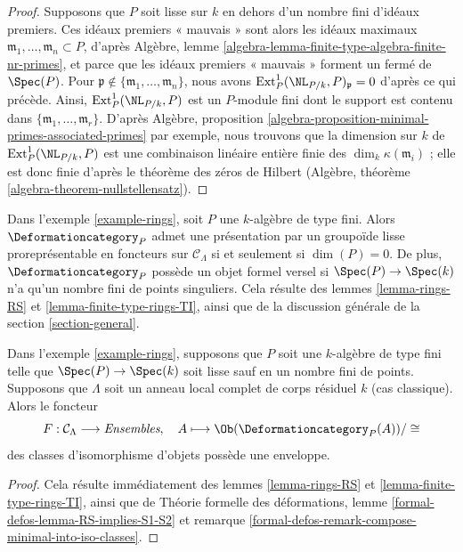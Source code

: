 \begin{proof}
\medskip\noindent
Supposons que $P$ soit lisse sur $k$ en dehors d'un nombre fini d'idéaux premiers.
Ces idéaux premiers « mauvais » sont alors les idéaux maximaux
$\mathfrak m_1, \ldots, \mathfrak m_n \subset P$, d'après
Algèbre, lemme \ref{algebra-lemma-finite-type-algebra-finite-nr-primes},
et parce que les idéaux premiers « mauvais » forment un fermé de $\Spec(P)$.
Pour $\mathfrak p \not \in \{\mathfrak m_1, \ldots, \mathfrak m_n\}$,
nous avons $\text{Ext}^1_P(\NL_{P/k}, P)_\mathfrak p = 0$ d'après ce qui précède.
Ainsi, $\text{Ext}^1_P(\NL_{P/k}, P)$ est un $P$-module fini
dont le support est contenu dans $\{\mathfrak m_1, \ldots, \mathfrak m_r\}$.
D'après Algèbre, proposition
\ref{algebra-proposition-minimal-primes-associated-primes}
par exemple, nous trouvons que la dimension sur $k$ de
$\text{Ext}^1_P(\NL_{P/k}, P)$ est une combinaison linéaire entière finie
des $\dim_k \kappa(\mathfrak m_i)$ ; elle est donc finie d'après
le théorème des zéros de Hilbert
(Algèbre, théorème \ref{algebra-theorem-nullstellensatz}).
\end{proof}

\noindent
Dans l'exemple \ref{example-rings}, soit $P$ une
$k$-algèbre de type fini. Alors $\Deformationcategory_P$
admet une présentation par un groupoïde lisse proreprésentable en foncteurs
sur $\mathcal{C}_\Lambda$ si et seulement si $\dim(P) = 0$.
De plus, $\Deformationcategory_P$ possède un objet
formel versel si $\Spec(P) \to \Spec(k)$ n'a qu'un nombre fini de
points singuliers. Cela résulte des lemmes \ref{lemma-rings-RS} et
\ref{lemma-finite-type-rings-TI},
ainsi que de la discussion générale de la section \ref{section-general}.

\begin{lemma}
\label{lemma-rings-hull}
Dans l'exemple \ref{example-rings}, supposons que $P$ soit une
$k$-algèbre de type fini telle que $\Spec(P) \to \Spec(k)$ soit lisse sauf
en un nombre fini de points.
Supposons que $\Lambda$ soit un anneau local complet de corps résiduel $k$
(cas classique). Alors le foncteur
$$
F : \mathcal{C}_\Lambda \longrightarrow \textit{Ensembles},\quad
A \longmapsto \Ob(\Deformationcategory_P(A))/\cong
$$
des classes d'isomorphisme d'objets possède une enveloppe.
\end{lemma}

\begin{proof}
Cela résulte immédiatement des lemmes \ref{lemma-rings-RS} et
\ref{lemma-finite-type-rings-TI}, ainsi que de
Théorie formelle des déformations, lemme \ref{formal-defos-lemma-RS-implies-S1-S2}
et remarque \ref{formal-defos-remark-compose-minimal-into-iso-classes}.
\end{proof}

